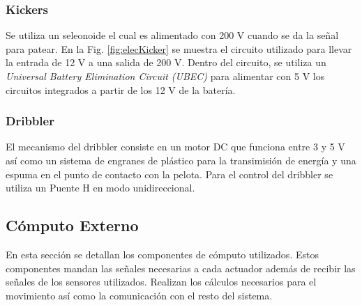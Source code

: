 \documentclass[twocolumn,10pt]{amrob}
\begin{document}
\subsubsection*{Kickers}
Se utiliza un seleonoide el cual es alimentado con 200 V cuando se da la señal para patear. En la Fig. \ref{fig:elecKicker} se muestra el circuito utilizado para llevar la entrada de 12 V a una salida de 200 V. Dentro del circuito, se utiliza un \textit{Universal Battery Elimination Circuit (UBEC)} para alimentar con 5 V los circuitos integrados a partir de los 12 V de la batería. \par
\subsubsection*{Dribbler}
El mecanismo del dribbler consiste en un motor DC que funciona entre 3 y 5 V así como un sistema de engranes de plástico para la transimisión de energía y una espuma en el punto de contacto con la pelota. Para el control del dribbler se utiliza un Puente H en modo unidireccional. \par 

\subsection*{Cómputo Externo}
En esta sección se detallan los componentes de cómputo utilizados. Estos componentes mandan las señales necesarias a cada actuador además de recibir las señales de los sensores utilizados. Realizan los cálculos necesarios para el movimiento así como la comunicación con el resto del sistema.  
\end{document}
